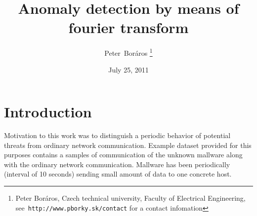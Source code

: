 \documentclass[a4paper]{IEEEtran}
\begin{document}
\title{Anomaly detection by means of fourier transform}
\date{July 25, 2011}
\author{Peter~Boráros %
\thanks{{Peter Boráros}, Czech technical university, Faculty of Electrical Engineering,
see~\texttt{http://www.pborky.sk/contact} for a contact infomation}}%



\maketitle
\IEEEdisplaynotcompsoctitleabstractindextext
\IEEEpeerreviewmaketitle


\section{Introduction}
Motivation to this work was to distinguish a periodic behavior of 
potential threats from ordinary network communication. Example dataset
provided for this purposes contains a samples of communication of the 
unknown mallware along with the ordinary network communication.
Mallware has been periodically (interval of 10 seconds) sending 
small amount of data to one concrete host.
\end{document}

